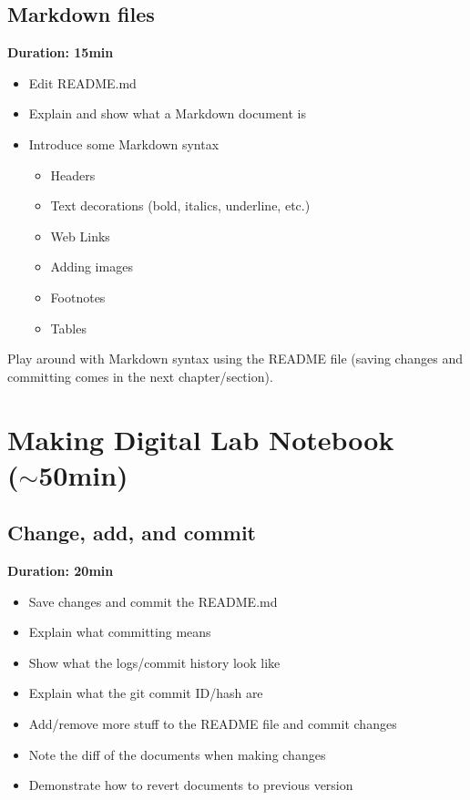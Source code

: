 \documentclass[a4paper, 12pt, oneside]{report} %
\begin{document}
\section{Markdown files}
\label{sec:markdown_files}

{\bfseries Duration: 15min}

\begin{itemize}
	\item Edit README.md
	\item Explain and show what a Markdown document is
	\item Introduce some Markdown syntax
		\begin{itemize}
			\item Headers
			\item Text decorations (bold, italics, underline, etc.)
			\item Web Links
			\item Adding images
			\item Footnotes
			\item Tables
		\end{itemize}
\end{itemize}

\noindent
Play around with Markdown syntax using the README file (saving changes and committing comes in the next chapter/section).


\chapter{Making Digital Lab Notebook\\($\sim$50min)}
\label{cha:making_digital_lab_notebook}

\section{Change, add, and commit}
\label{sec:change_add_and_commit}

{\bfseries Duration: 20min}

\begin{itemize}
	\item Save changes and commit the README.md
	\item Explain what committing means
	\item Show what the logs/commit history look like
	\item Explain what the git commit ID/hash are
	\item Add/remove more stuff to the README file and commit changes
	\item Note the diff of the documents when making changes
	\item Demonstrate how to revert documents to previous version
\end{itemize}
\end{document}
